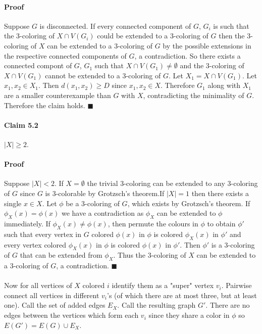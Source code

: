 \documentclass[letterpaper,12pt,oneside,onecolumn]{report}
\begin{document}
\paragraph{Proof}
Suppose $G$ is disconnected. If every connected component of $G$, $G_i$ is such that the $3$-coloring of $X \cap V(G_i)$ could be extended to a $3$-coloring of $G$ then the $3$-coloring of $X$ can be extended to a $3$-coloring of $G$ by the possible extensions in the respective connected components of $G$, a contradiction. So there exists a connected compont of $G$,  $G_1$ such that $X \cap V(G_1) \neq \emptyset$ and the $3$-coloring of $X \cap V(G_1)$ cannot be extended to a $3$-coloring of $G$. Let $X_1 = X \cap V(G_1)$. Let $x_1, x_2 \in X_1$. Then $d(x_1, x_2) \geq D$ since $x_1, x_2 \in X$. Therefore $G_1$ along with $X_1$ are a smaller counterexample than $G$ with $X$, contradicting the minimality of $G$. Therefore the claim holds. $\blacksquare$
\paragraph{Claim 5.2}
$|X| \geq 2$.
\paragraph{Proof}
Suppose $|X| < 2$. If $X = \emptyset$ the trivial $3$-coloring can be extended to any $3$-coloring of $G$ since $G$ is $3$-colorable by Grotzsch's theorem.If $|X| = 1$ then there exists a single $x \in X$.  Let $\phi$ be a $3$-coloring of $G$, which exists by Grotzsch's theorem. If $\phi_X(x) = \phi(x)$ we have a contradiction as $\phi_X$ can be extended to $\phi$ immediately. If $\phi_X(x) \neq \phi(x)$, then permute the colours in $\phi$ to obtain $\phi'$ such that every vertex in $G$ colored $\phi(x)$ in $\phi$ is colored $\phi_X(x)$ in $\phi'$ and every vertex colored $\phi_X(x)$ in $\phi$ is colored $\phi(x)$ in $\phi'$. Then $\phi'$ is a $3$-coloring of $G$ that can be extended from $\phi_X$. Thus the $3$-coloring of $X$ can be extended to a $3$-coloring of $G$, a contradiction. $\blacksquare$
\paragraph{}
Now for all vertices of $X$ colored $i$ identify them as a "super" vertex $v_i$. Pairwise connect all vertices in different $v_i$'s (of which there are at most three, but at least one). Call the set of added edges $E_X$. Call the resulting graph $G'$. There are no edges between the vertices which form each $v_i$  since they share a color in $\phi$ so $E(G') = E(G) \cup E_X $.
\end{document}
